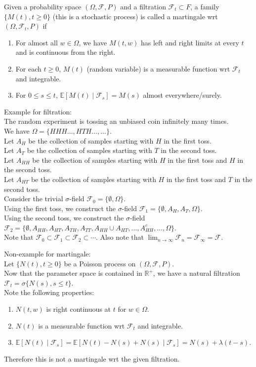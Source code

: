 \documentclass[a4paper]{article}
\newcommand{\nl}{\vspace{0.2cm}\\}
\newcommand{\F}{\mathcal{F}}
\newcommand{\R}{\mathbb{R}}
\newcommand{\E}{\mathbb{E}}
\begin{document}
\begin{defn}
    Given a probability space $(\Omega, \F, P)$ and a filtration $\F_t \subset F$, a family $\{M(t), t \ge 0\}$ (this is a stochastic process) is called a martingale wrt $(\Omega, \F_t, P)$ if
    \begin{enumerate}
        \item For almost all $w \in \Omega$, we have $M(t, w)$ has left and right limits at every $t$ and is continuous from the right.
        \item For each $t \ge 0$, $M(t)$ (random variable) is a measurable function wrt $\F_t$ and integrable.
        \item For $0 \le s \le t$, $\E[M(t) \mid \F_s] = M(s)$ almost everywhere/surely.
    \end{enumerate}
\end{defn}

\begin{eg}
    Example for filtration:\nl
    The random experiment is tossing an unbiased coin infinitely many times.\nl
    We have $\Omega = \{HHH\ldots, HTH\ldots, \ldots\}$.\nl
    Let $A_H$ be the collection of samples starting with $H$ in the first toss.\nl
    Let $A_T$ be the collection of samples starting with $T$ in the second toss.\nl
    Let $A_{HH}$ be the collection of samples starting with $H$ in the first toss and $H$ in the second toss.\nl
    Let $A_{HT}$ be the collection of samples starting with $H$ in the first toss and $T$ in the second toss.\nl
    Consider the trivial $\sigma$-field $\F_0 = \{\emptyset, \Omega\}$.\nl
    Using the first toss, we construct the $\sigma$-field $\F_1 = \{\emptyset, A_H, A_T, \Omega\}$.\nl
    Using the second toss, we construct the $\sigma$-field $\F_2 = \{\emptyset, A_{HH}, A_{HT}, A_{TH}, A_{TT}, A_{HH} \cup A_{HT}, \ldots, A_{HH}^c, \ldots, \Omega\}$.\nl
    Note that $\F_0 \subset \F_1 \subset \F_2 \subset \cdots$. Also note that $\lim_{n \to \infty} \F_n = \F_\infty = \F$.
\end{eg}

\begin{eg}
    Non-example for martingale:\nl
    Let $\{N(t), t \ge 0\}$ be a Poisson process on $(\Omega, \F, P)$.\nl
    Now that the parameter space is contained in $\R^+$, we have a natural filtration $\F_t = \sigma \{N(s), s \le t\}$.\nl
    Note the following properties:
    \begin{enumerate}
        \item $N(t, w)$ is right continuous at $t$ for $w \in \Omega$.
        \item $N(t)$ is a measurable function wrt $\F_t$ and integrable.
        \item $\E[N(t) \mid \F_s] = \E[N(t) - N(s) + N(s) \mid \F_s] = N(s) + \lambda(t - s)$.
    \end{enumerate}
    Therefore this is not a martingale wrt the given filtration.
\end{eg}
\end{document}
